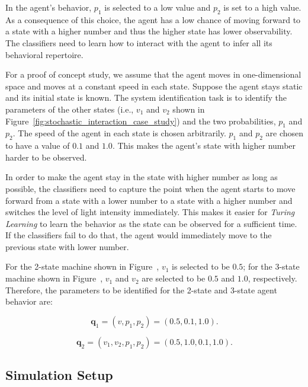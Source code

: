 In the agent's behavior, $p_1$ is selected to a low value and $p_2$ is set to a high value. As a consequence of this choice, the agent has a low chance of moving forward to a state with a higher number and thus the higher state has lower observability. The classifiers need to learn how to interact with the agent to infer all its behavioral repertoire.

For a proof of concept study, we assume that the agent moves in one-dimensional space and moves at a constant speed in each state. Suppose the agent stays static and its initial state is known. The system identification task is to identify the parameters of the other states (i.e., $v_1$ and $v_2$ shown in Figure~\ref{fig:stochastic_interaction_case_study}) and the two probabilities, $p_1$ and $p_2$. The speed of the agent in each state is chosen arbitrarily. $p_1$ and $p_2$ are chosen to have a value of $0.1$ and $1.0$. This makes the agent's state with higher number harder to be observed.

In order to make the agent stay in the state with higher number as long as possible, the classifiers need to capture the point when the agent starts to move forward from a state with a lower number to a state with a higher number and switches the level of light intensity immediately. This makes it easier for \textit{Turing Learning} to learn the behavior as the state can be observed for a sufficient time. If the classifiers fail to do that, the agent would immediately move to the previous state with lower number. 

For the 2-state machine shown in Figure~, $v_1$ is selected to be $0.5$; for the 3-state machine shown in Figure~, $v_1$ and $v_2$ are selected to be $0.5$ and $1.0$, respectively. Therefore, the parameters to be identified for the 2-state and 3-state agent behavior are:

\begin{equation}\label{eq:parameters_2_states}
\mathbf{q}_1 = (v, p_1, p_2) = (0.5, 0.1, 1.0).
\end{equation}

\begin{equation}\label{eq:parameters_3_states}
\mathbf{q}_2 = (v_1, v_2, p_1, p_2) = (0.5, 1.0, 0.1, 1.0).
\end{equation}

\subsection{Simulation Setup}\label{sec:simulation_setup_stochastic_interaction}

